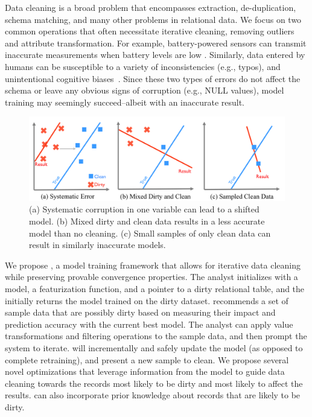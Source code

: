 Data cleaning is a broad problem that encompasses extraction, de-duplication, schema matching, and many other problems in relational data.
We focus on two common operations that often necessitate iterative cleaning, removing outliers and attribute transformation.
For example, battery-powered sensors can transmit inaccurate measurements when battery levels are low \cite{DBLP:conf/pervasive/JefferyAFHW06}. 
Similarly, data entered by humans can be susceptible to a variety of inconsistencies (e.g., typos), and unintentional cognitive biases~\cite{DBLP:conf/recsys/KrishnanPFG14}.
Since these two types of errors do not affect the schema or leave any obvious signs of corruption (e.g., NULL values), model training may seemingly succeed--albeit with an inaccurate result.

\begin{figure}[t]
\centering
 \includegraphics[width=\columnwidth]{figs/update-arch.png}
 \caption{(a) Systematic corruption in one variable can lead to a shifted model. 
 (b) Mixed dirty and clean data results in a less accurate model than no cleaning.
(c) Small samples of only clean data can result in similarly inaccurate models. \label{update-arch1}}
\vspace{-2em}
\end{figure}

We propose \sys, a model training framework that allows for iterative data cleaning while preserving provable convergence properties.
The analyst initializes \sys with a model, a featurization function, and a pointer to a dirty relational table, and the \sys initially returns the model trained on the dirty dataset.
\sys recommends a set of sample data that are possibly dirty based on measuring their impact and prediction accuracy with the current best model.
The analyst can apply value transformations and filtering operations to the sample data, and then prompt the system to iterate. 
\sys will incrementally and safely update the model (as opposed to complete retraining), and present a new sample to clean.
We propose several novel optimizations that leverage information from the model to guide data cleaning towards the records most likely to be dirty and most likely to affect the results.
\sys can also incorporate prior knowledge about records that are likely to be dirty.

